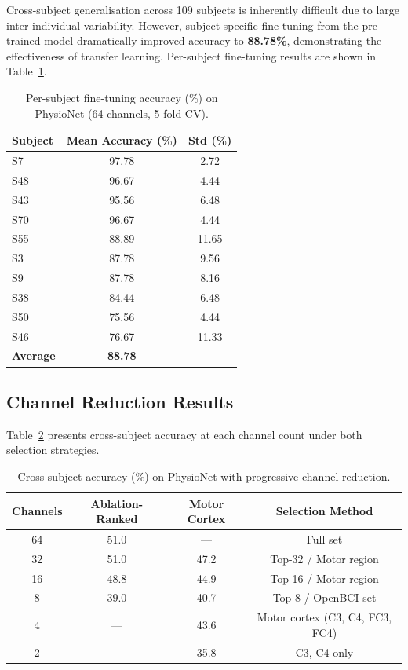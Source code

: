 \documentclass[12pt, a4paper]{article}
\begin{document}
Cross-subject generalisation across 109 subjects is inherently difficult due to large inter-individual variability. However, subject-specific fine-tuning from the pre-trained model dramatically improved accuracy to \textbf{88.78\%}, demonstrating the effectiveness of transfer learning. Per-subject fine-tuning results are shown in Table~\ref{tab:finetune_detail}.

\begin{table}[htbp]
\centering
\caption{Per-subject fine-tuning accuracy (\%) on PhysioNet (64 channels, 5-fold CV).}
\label{tab:finetune_detail}
\begin{tabular}{lcc}
\toprule
\textbf{Subject} & \textbf{Mean Accuracy (\%)} & \textbf{Std (\%)} \\
\midrule
S7  & 97.78 & 2.72 \\
S48 & 96.67 & 4.44 \\
S43 & 95.56 & 6.48 \\
S70 & 96.67 & 4.44 \\
S55 & 88.89 & 11.65 \\
S3  & 87.78 & 9.56 \\
S9  & 87.78 & 8.16 \\
S38 & 84.44 & 6.48 \\
S50 & 75.56 & 4.44 \\
S46 & 76.67 & 11.33 \\
\midrule
\textbf{Average} & \textbf{88.78} & --- \\
\bottomrule
\end{tabular}
\end{table}

\subsection{Channel Reduction Results}

Table~\ref{tab:channel_reduction} presents cross-subject accuracy at each channel count under both selection strategies.

\begin{table}[htbp]
\centering
\caption{Cross-subject accuracy (\%) on PhysioNet with progressive channel reduction.}
\label{tab:channel_reduction}
\begin{tabular}{cccc}
\toprule
\textbf{Channels} & \textbf{Ablation-Ranked} & \textbf{Motor Cortex} & \textbf{Selection Method} \\
\midrule
64 & 51.0 & --- & Full set \\
32 & 51.0 & 47.2 & Top-32 / Motor region \\
16 & 48.8 & 44.9 & Top-16 / Motor region \\
8  & 39.0 & 40.7 & Top-8 / OpenBCI set \\
4  & --- & 43.6 & Motor cortex (C3, C4, FC3, FC4) \\
2  & --- & 35.8 & C3, C4 only \\
\bottomrule
\end{tabular}
\end{table}
\end{document}
